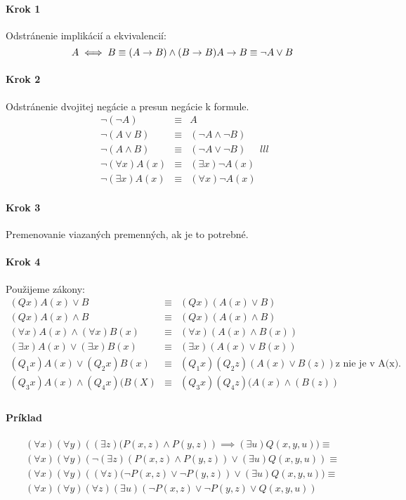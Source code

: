 \paragraph{Krok 1} Odstránenie implikácií a ekvivalencií:
$$ 
	A \iff B \equiv (A \implies B) \land (B \implies B) \\
	A \implies B \equiv \neg A \lor B
$$

\paragraph{Krok 2} Odstránenie dvojitej negácie a presun negácie k formule.
$$
\begin{array}{lll}
	\neg (\neg A) &\equiv& A \\
	\neg (A \lor B) &\equiv& (\neg A \land \neg B) \\
	\neg (A \land B) &\equiv& (\neg A \lor \neg B) \\
	\neg (\forall x) A(x) &\equiv& (\exists x) \neg A(x) \\
	\neg (\exists x) A(x) &\equiv& (\forall x) \neg A(x)
\end{array}{lll}
$$

\paragraph{Krok 3} Premenovanie viazaných premenných, ak je to potrebné.
\paragraph{Krok 4} Použijeme zákony:
$$
\begin{array}{lll}
	(Q x) A(x) \lor B &\equiv& (Q x)(A(x) \lor B) \\
	(Q x)A(x) \land B &\equiv& (Q x)(A(x) \land B) \\
	(\forall x) A(x) \land (\forall x)B(x) &\equiv& (\forall x)(A(x) \land
	B(x))\\
	(\exists x)A(x) \lor (\exists x)B(x) &\equiv& (\exists x) (A(x)\lor B(x))
	\\
	(Q_1 x) A(x) \lor (Q_2 x)B(x) &\equiv& (Q_1 x)(Q_2 z) (A(x)\lor B(z))
	\mbox{z nie je v A(x)}. \\
	(Q_3 x) A(x) \land (Q_4 x)(B(X) &\equiv& (Q_3 x)(Q_4 z)(A(x) \land (B(z))
	\\
\end{array}
$$

\paragraph{Príklad} $$
\begin{array}{l}
(\forall x)(\forall y) \left( (\exists z)(P(x,z) \land
P(y,z)\right) \implies (\exists u) Q(x,y,u)) \equiv \\
(\forall x)(\forall
y)\left(\neg (\exists z)(P(x,z)\land P(y,z))\lor(\exists u)Q(x,y,u)\right)
\equiv \\
(\forall x)(\forall y)\left((\forall z)(\neg P(x,z)\lor \neg
P(y,z)\right)\lor(\exists u)Q(x,y,u)) \equiv \\
(\forall x)(\forall y)(\forall z)(\exists u)(\neg P(x,z) \lor \neg
P(y,z) \lor Q(x,y,u)) \\
\end{array}
$$

